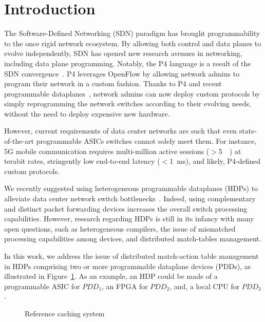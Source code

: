 \section{Introduction}\label{sec:intro}

The Software-Defined Networking (SDN) paradigm has brought programmability to the once rigid network ecosystem.
By allowing both control and data planes to evolve independently, SDN has opened new research avenues in networking, including data plane programming.
Notably, the P4 language is a result of the SDN convergence~\cite{Bosshart:14}.
P4 leverages OpenFlow by allowing network admins to program their network in a custom fashion.
Thanks to P4 and recent programmable dataplanes~\cite{Bosshart:13}, network admins can now deploy custom protocols by simply reprogramming the network switches according to their evolving needs, without the need to deploy expensive new hardware. 


However, current requirements of data center networks are such that even state-of-the-art programmable ASICs switches cannot solely meet them.
For instance, 5G mobile communication requires multi-million active sessions ($>$\SI{5}{\mega\nothing}) at terabit rates, stringently low end-to-end latency ($<$\SI{1}{\milli\second}), and likely, P4-defined custom protocols.

We recently suggested using heterogeneous programmable dataplanes (HDPs) to alleviate data center network switch bottlenecks~\cite{p4eu:18}.
Indeed, using complementary and distinct packet forwarding devices increases the overall switch processing capabilities.
However, research regarding HDPs is still in its infancy with many open questions, such as heterogeneous compilers, the issue of mismatched processing capabilities among devices, and distributed match-tables management.

In this work, we address the issue of distributed match-action table management in HDPs comprising two or more programmable dataplane devices (PDDs), as illustrated in Figure~\ref{fig:high_level_network}.
As an example, an HDP could be made of a programmable ASIC for $PDD_1$, an  FPGA for $PDD_2$, and, a local CPU for $PDD_3$.

\begin{figure}[]
	\centering
	
	\caption{Reference caching system}
	\label{fig:high_level_network}
\end{figure}

